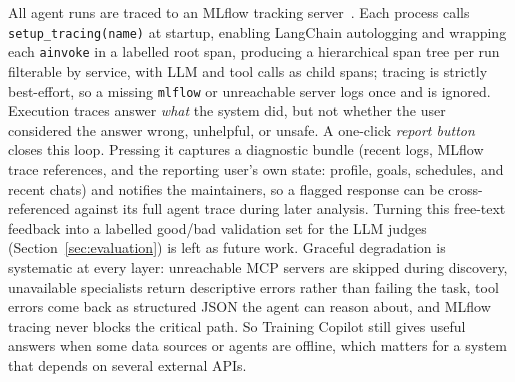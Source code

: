 All agent runs are traced to an MLflow tracking server~\citep{mlflow_multiturn_2025}. Each process calls \texttt{setup\_tracing(name)} at startup, enabling LangChain autologging and wrapping each \texttt{ainvoke} in a labelled root span, producing a hierarchical span tree per run filterable by service, with LLM and tool calls as child spans; tracing is strictly best-effort, so a missing \texttt{mlflow} or unreachable server logs once and is ignored. Execution traces answer \textit{what} the system did, but not whether the user considered the answer wrong, unhelpful, or unsafe. A one-click \textit{report button} closes this loop. Pressing it captures a diagnostic bundle (recent logs, MLflow trace references, and the reporting user's own state: profile, goals, schedules, and recent chats) and notifies the maintainers, so a flagged response can be cross-referenced against its full agent trace during later analysis. Turning this free-text feedback into a labelled good/bad validation set for the LLM judges (Section~\ref{sec:evaluation}) is left as future work. Graceful degradation is systematic at every layer: unreachable MCP servers are skipped during discovery, unavailable specialists return descriptive errors rather than failing the task, tool errors come back as structured JSON the agent can reason about, and MLflow tracing never blocks the critical path. So Training Copilot still gives useful answers when some data sources or agents are offline, which matters for a system that depends on several external APIs.
